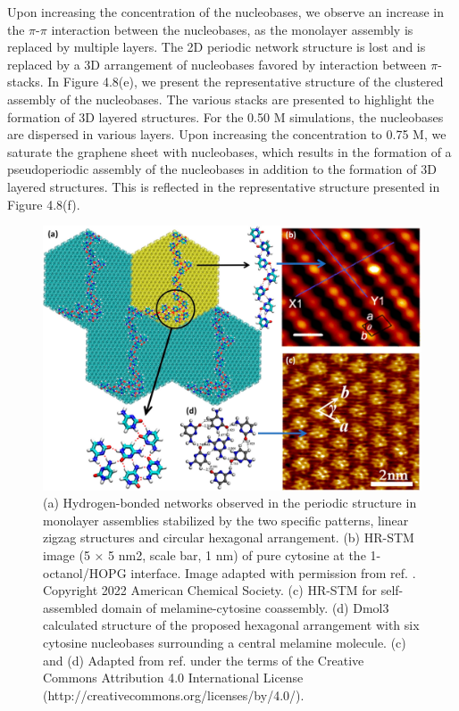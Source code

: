 Upon increasing the concentration of the nucleobases, we observe an increase in the $\pi$-$\pi$ interaction between the nucleobases, as the monolayer assembly is replaced by multiple layers. The 2D periodic network structure is lost and is replaced by a 3D arrangement of nucleobases favored by interaction between $\pi$-stacks. In Figure 4.8(e), we present the representative structure of the clustered assembly of the nucleobases. The various stacks are presented to highlight the formation of 3D layered structures. For the 0.50 M simulations, the nucleobases are dispersed in various layers. Upon increasing the concentration to 0.75 M, we saturate the graphene sheet with nucleobases, which results in the formation of a pseudoperiodic assembly of the nucleobases in addition to the formation of 3D layered structures. This is reflected in the representative structure presented in Figure 4.8(f).
\begin{figure}
    \centering
    \includegraphics[width=\textwidth]{Chapter2/Figures/Figure7.png}
    \caption[Hydrogen-bonded networks observed in the periodic structure in monolayer assemblies stabilized by the two specific patterns, linear zigzag structures and circular hexagonal arrangement. HR-STM images from experimental reports are also presented]{(a) Hydrogen-bonded networks observed in the periodic structure in monolayer assemblies stabilized by the two specific patterns, linear zigzag structures and circular hexagonal arrangement. (b) HR-STM image (5 × 5 nm2, scale bar, 1 nm) of pure cytosine at the 1-octanol/HOPG interface. Image adapted with permission from ref. \supercite{xu_coadsorption_2006}. Copyright 2022 American Chemical Society. (c) HR-STM for self-assembled domain of melamine-cytosine coassembly. (d) Dmol3 calculated structure of the proposed hexagonal arrangement with six cytosine nucleobases surrounding a central melamine molecule. (c) and (d) Adapted from ref. \supercite{zhao_investigating_2016} under the terms of the Creative Commons Attribution 4.0 International License (http://creativecommons.org/licenses/by/4.0/).}
\end{figure}

